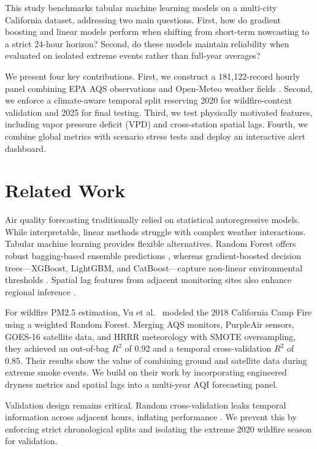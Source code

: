 \documentclass[pdflatex,sn-mathphys-num]{sn-jnl}
\begin{document}
This study benchmarks tabular machine learning models on a multi-city California dataset, addressing two main questions. First, how do gradient boosting and linear models perform when shifting from short-term nowcasting to a strict 24-hour horizon? Second, do these models maintain reliability when evaluated on isolated extreme events rather than full-year averages?

We present four key contributions. First, we construct a 181,122-record hourly panel combining EPA AQS observations and Open-Meteo weather fields \cite{epa_aqs,epa_aqs_api}. Second, we enforce a climate-aware temporal split reserving 2020 for wildfire-context validation and 2025 for final testing. Third, we test physically motivated features, including vapor pressure deficit (VPD) and cross-station spatial lags. Fourth, we combine global metrics with scenario stress tests and deploy an interactive alert dashboard.

\section{Related Work}\label{sec:related-work}
Air quality forecasting traditionally relied on statistical autoregressive models. While interpretable, linear methods struggle with complex weather interactions. Tabular machine learning provides flexible alternatives. Random Forest offers robust bagging-based ensemble predictions \cite{breiman2001random}, whereas gradient-boosted decision trees—XGBoost, LightGBM, and CatBoost—capture non-linear environmental thresholds \cite{chen2016xgboost,ke2017lightgbm,prokhorenkova2018catboost}. Spatial lag features from adjacent monitoring sites also enhance regional inference \cite{zheng2013uair}.

For wildfire PM2.5 estimation, Vu et al.\ \cite{vu2022geostationary} modeled the 2018 California Camp Fire using a weighted Random Forest. Merging AQS monitors, PurpleAir sensors, GOES-16 satellite data, and HRRR meteorology with SMOTE oversampling, they achieved an out-of-bag $R^2$ of 0.92 and a temporal cross-validation $R^2$ of 0.85. Their results show the value of combining ground and satellite data during extreme smoke events. We build on their work by incorporating engineered dryness metrics and spatial lags into a multi-year AQI forecasting panel.

Validation design remains critical. Random cross-validation leaks temporal information across adjacent hours, inflating performance \cite{bergmeir2018note,roberts2017crossvalidation}. We prevent this by enforcing strict chronological splits and isolating the extreme 2020 wildfire season for validation.
\end{document}

